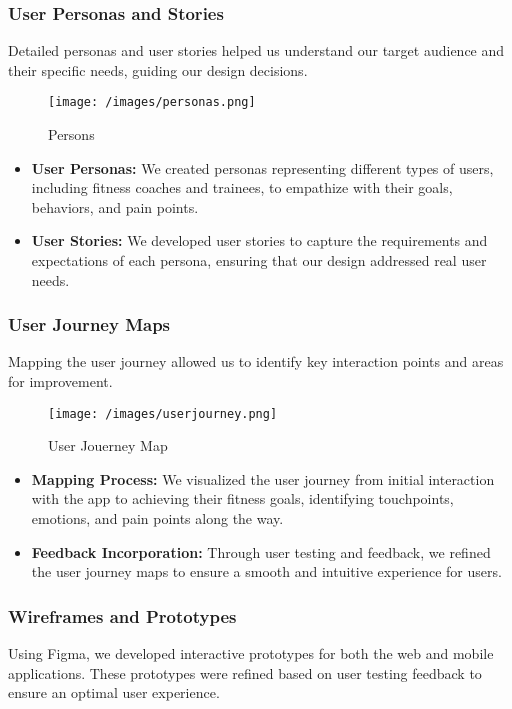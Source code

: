 \subsubsection{User Personas and Stories}
Detailed personas and user stories helped us understand our target audience and their specific needs, guiding our design decisions.
\begin{figure}[H]
    \centering
    \texttt{[image: /images/personas.png]}
    \caption{Persons}
    \label{fig:example_image}
  \end{figure}


\begin{itemize}
  \item \textbf{User Personas:} We created personas representing different types of users, including fitness coaches and trainees, to empathize with their goals, behaviors, and pain points.
  
  \item \textbf{User Stories:} We developed user stories to capture the requirements and expectations of each persona, ensuring that our design addressed real user needs.
\end{itemize}


\subsubsection{User Journey Maps}
Mapping the user journey allowed us to identify key interaction points and areas for improvement.

\begin{figure}[H]
    \centering
    \texttt{[image: /images/userjourney.png]}
    \caption{User Jouerney Map}
    \label{fig:example_image}
  \end{figure}


\begin{itemize}
  \item \textbf{Mapping Process:} We visualized the user journey from initial interaction with the app to achieving their fitness goals, identifying touchpoints, emotions, and pain points along the way.
  
  \item \textbf{Feedback Incorporation:} Through user testing and feedback, we refined the user journey maps to ensure a smooth and intuitive experience for users.
\end{itemize}

\subsubsection{Wireframes and Prototypes}
Using Figma, we developed interactive prototypes for both the web and mobile applications. These prototypes were refined based on user testing feedback to ensure an optimal user experience.

